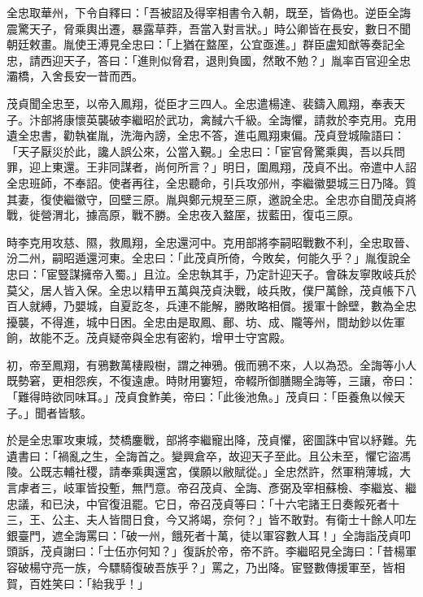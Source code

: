 \begin{pinyinscope}
 全忠取華州，下令自釋曰：「吾被詔及得宰相書令入朝，既至，皆偽也。逆臣全誨震驚天子，脅乘輿出遷，暴露草莽，吾當入對言狀。」時公卿皆在長安，數日不聞朝廷敕畫。胤使王溥見全忠曰：「上猶在盩厔，公宜亟進。」群臣盧知猷等奏記全忠，請西迎天子，答曰：「進則似脅君，退則負國，然敢不勉？」胤率百官迎全忠灞橋，入舍長安一昔而西。



 茂貞聞全忠至，以帝入鳳翔，從臣才三四人。全忠遣楊達、裴鑄入鳳翔，奉表天子。汴部將康懷英襲破李繼昭於武功，禽馘六千級。全誨懼，請救於李克用。克用遺全忠書，勸執崔胤，洗海內謗，全忠不答，進屯鳳翔東偏。茂貞登城隃語曰：「天子厭災於此，讒人誤公來，公當入覲。」全忠曰：「宦官脅驚乘輿，吾以兵問罪，迎上東還。王非同謀者，尚何所言？」明日，圍鳳翔，茂貞不出。帝遣中人詔全忠班師，不奉詔。使者再往，全忠聽命，引兵攻邠州，李繼徽嬰城三日乃降。質其妻，復使繼徽守，回壁三原。胤與鄭元規至三原，邀說全忠。全忠亦自聞茂貞將戰，徙營渭北，據高原，戰不勝。全忠夜入盩厔，拔藍田，復屯三原。



 時李克用攻慈、隰，救鳳翔，全忠還河中。克用部將李嗣昭戰數不利，全忠取晉、汾二州，嗣昭遁還河東。全忠曰：「此茂貞所倚，今敗矣，何能久乎？」胤復說全忠曰：「宦豎謀擁帝入蜀。」且泣。全忠執其手，乃定計迎天子。會硃友寧敗岐兵於莫父，居人皆入保。全忠以精甲五萬與茂貞決戰，岐兵敗，僕尸萬餘，茂貞帳下八百人就縛，乃嬰城，自夏訖冬，兵連不能解，勝敗略相償。援軍十餘壁，數為全忠擾襲，不得進，城中日困。全忠由是取鳳、鄜、坊、成、隴等州，間劫鈔以佐軍餉，故能不乏。茂貞疑帝與全忠有密約，增甲士守宮殿。



 初，帝至鳳翔，有鴉數萬棲殿樹，謂之神鴉。俄而鴉不來，人以為恐。全誨等小人既勢窘，更相怨疾，不復遠慮。時財用窶短，帝輟所御膳賜全誨等，三讓，帝曰：「難得時欲同味耳。」茂貞食鮓美，帝曰：「此後池魚。」茂貞曰：「臣養魚以候天子。」聞者皆駭。



 於是全忠軍攻東城，焚橋鏖戰，部將李繼寵出降，茂貞懼，密圖誅中官以紓難。先遺書曰：「禍亂之生，全誨首之。變興倉卒，故迎天子至此。且公未至，懼它盜馮陵。公既志輔社稷，請奉乘輿還宮，僕願以敝賦從。」全忠然許，然軍稍薄城，大言虖者三，岐軍皆投塹，無鬥意。帝召茂貞、全誨、彥弼及宰相蘇檢、李繼岌、繼忠議，和已決，中官復沮罷。它日，帝召茂貞等曰：「十六宅諸王日奏餒死者十三，王、公主、夫人皆間日食，今又將竭，奈何？」皆不敢對。有衛士十餘人叩左銀臺門，遮全誨罵曰：「破一州，餓死者十萬，徒以軍容數人耳！」全誨詣茂貞叩頭訴，茂貞謝曰：「士伍亦何知？」復訴於帝，帝不許。李繼昭見全誨曰：「昔楊軍容破楊守亮一族，今驃騎復破吾族乎？」罵之，乃出降。宦豎數傳援軍至，皆相賀，百姓笑曰：「紿我乎！」




\end{pinyinscope}
